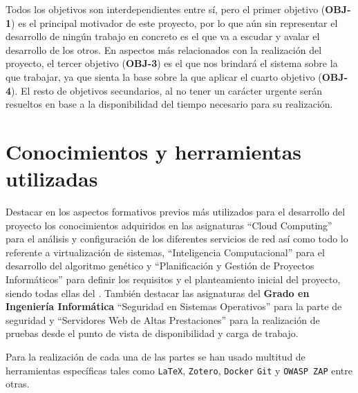 Todos los objetivos son interdependientes entre sí, pero el primer objetivo (\textbf{OBJ-1}) es el principal motivador de este proyecto, por lo que aún sin representar el desarrollo de ningún trabajo en concreto es el que va a escudar y avalar el desarrollo de los otros. En aspectos más relacionados con la realización del proyecto, el tercer objetivo (\textbf{OBJ-3}) es el que nos brindará el sistema sobre la que trabajar, ya que sienta la base sobre la que aplicar el cuarto objetivo (\textbf{OBJ-4}). El resto de objetivos secundarios, al no tener un carácter urgente serán resueltos en base a la disponibilidad del tiempo necesario para su realización.

\section{Conocimientos y herramientas utilizadas}

\bigskip
Destacar en los aspectos formativos previos más utilizados para el desarrollo del proyecto los conocimientos adquiridos en las asignaturas ``Cloud Computing'' para el análisis y configuración de los diferentes servicios de red así como todo lo referente a virtualización de sistemas, ``Inteligencia Computacional'' para el desarrollo del algoritmo genético y ``Planificación y Gestión de Proyectos Informáticos'' para definir los requisitos y el planteamiento inicial del proyecto, siendo todas ellas del \textbf{\master}. También destacar las asignaturas del \textbf{Grado en Ingeniería Informática} ``Seguridad en Sistemas Operativos'' para la parte de seguridad y ``Servidores Web de Altas Prestaciones'' para la realización de pruebas desde el punto de vista de disponibilidad y carga de trabajo.

\bigskip
Para la realización de cada una de las partes se han usado multitud de herramientas específicas tales como \texttt{LaTeX}, \texttt{Zotero}, \texttt{Docker} \texttt{Git} y \texttt{OWASP ZAP} entre otras.

